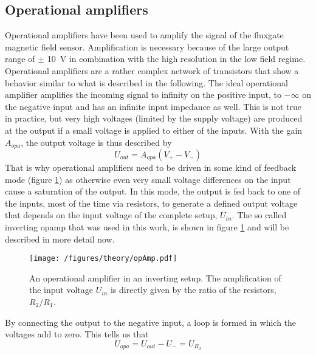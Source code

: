             \subsection{Operational amplifiers}
                Operational amplifiers have been used to amplify the signal of the fluxgate magnetic field sensor. Amplification is necessary because of the large output range of $\pm$ \SI{10}{\volt} in combination with the high resolution in the low field regime. Operational amplifiers are a rather complex network of transistors that show a behavior similar to what is described in the following. The ideal operational amplifier amplifies the incoming signal to infinity on the positive input, to $-\infty$ on the negative input and has an infinite input impedance as well. This is not true in practice, but very high voltages (limited by the supply voltage) are produced at the output if a small voltage is applied to either of the inputs. With the gain $A_{opa}$, the output voltage is thus described by
                \begin{equation}
                        \label{equation:theory:OPAvoltage}
                    U_{out} = A_{opa}(V_+ - V_-)
                \end{equation}
                That is why operational amplifiers need to be driven in some kind of feedback mode (figure \ref{figure:theory:opAmp}) as otherwise even very small voltage differences on the input cause a saturation of the output. In this mode, the output is fed back to one of the inputs, most of the time via resistors, to generate a defined output voltage that depends on the input voltage of the complete setup, $U_{in}$. The so called inverting opamp that was used in this work, is shown in figure \ref{figure:theory:opAmp} and will be described in more detail now.
                \begin{figure}
                    \texttt{[image: /figures/theory/opAmp.pdf]}
                    \caption[Operational amplifier]{An operational amplifier in an inverting setup. The amplification of the input voltage $U_{in}$ is directly given by the ratio of the resistors, $R_2/R_1$.}
                    \label{figure:theory:opAmp}
                \end{figure}
                By connecting the output to the negative input, a loop is formed in which the voltages add to zero. This tells us that
                \begin{equation*}
                    U_{opa} = U_{out} - U_- = U_{R_2}
                \end{equation*}
